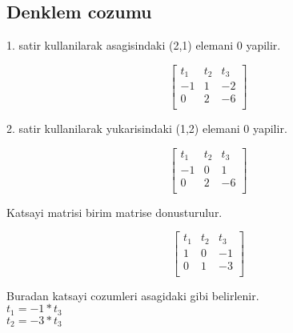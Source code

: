 \documentclass{article}
\begin{document}
\subsection{Denklem cozumu}
1. satir kullanilarak  asagisindaki (2,1) elemani 0 yapilir.\begin{center}
$$ \left[\begin{array}{rr|r}
t_{1} & t_{2} & t_{3}\\
-1 & 1 & -2\\
0 & 2 & -6\\
\end{array}\right] $$
\end{center}
2. satir kullanilarak  yukarisindaki (1,2) elemani 0 yapilir.\begin{center}
$$ \left[\begin{array}{rr|r}
t_{1} & t_{2} & t_{3}\\
-1 & 0 & 1\\
0 & 2 & -6\\
\end{array}\right] $$
\end{center}
Katsayi matrisi birim matrise donusturulur.
\begin{center}
$$ \left[\begin{array}{rr|r}
t_{1} & t_{2} & t_{3}\\
1 & 0 & -1\\
0 & 1 & -3\\
\end{array}\right] $$
\end{center}
Buradan katsayi cozumleri asagidaki gibi belirlenir.\\
$\displaystyle t_{1}=-1*t_{3}$\\
$\displaystyle t_{2}=-3*t_{3}$\\
\end{document}
